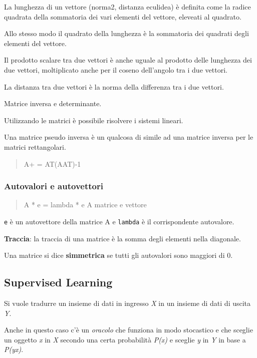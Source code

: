 La lunghezza di un vettore (norma2, distanza eculidea) è definita come
la radice quadrata della sommatoria dei vari elementi del vettore,
eleveati al quadrato.

Allo stesso modo il quadrato della lunghezza è la sommatoria dei
quadrati degli elementi del vettore.

Il prodotto scalare tra due vettori è anche uguale al prodotto delle
lunghezza dei due vettori, moltiplicato anche per il coseno dell'angolo
tra i due vettori.

La distanza tra due vettori è la norma della differenza tra i due
vettori.

Matrice inversa e determinante.

Utilizzando le matrici è possibile risolvere i sistemi lineari.

Una matrice pseudo inversa è un qualcosa di simile ad una matrice
inversa per le matrici rettangolari.

\begin{quote}
A+ = AT(AAT)-1
\end{quote}

\subsubsection{Autovalori e autovettori}\label{autovalori-e-autovettori}

\begin{quote}
A * e = lambda * e A matrice e vettore
\end{quote}

\texttt{e} è un autovettore della matrice A e \texttt{lambda} è il
corrispondente autovalore.

\textbf{Traccia}: la traccia di una matrice è la somma degli elementi
nella diagonale.

Una matrice si dice \textbf{simmetrica} se tutti gli autovalori sono
maggiori di 0.

\subsection{Supervised Learning}\label{supervised-learning}

Si vuole tradurre un insieme di dati in ingresso \emph{X} in un insieme
di dati di uscita \emph{Y}.

Anche in questo caso c'è un \emph{oracolo} che funziona in modo
stocastico e che sceglie un oggetto \emph{x} in \emph{X} secondo una
certa probabilità \emph{P(x)} e sceglie \emph{y} in \emph{Y} in base a
\emph{P(y\textbar{}x)}.

